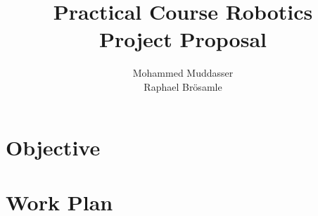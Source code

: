 \documentclass[12pt,pdftex,a4paper]{article}
\begin{document}
\title{Practical Course Robotics\\Project Proposal}
\author{Mohammed Muddasser\\Raphael Brösamle}
\date{}
\maketitle
\section*{Objective}

\section*{Work Plan}

\end{document}
